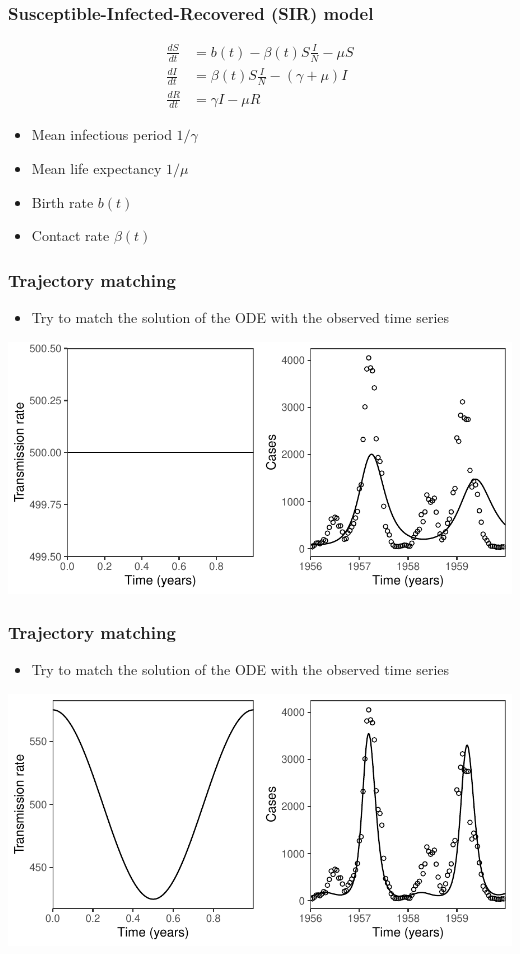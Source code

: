 \documentclass{beamer}
\begin{document}
\begin{frame}
\frametitle{Susceptible-Infected-Recovered (SIR) model}
$$
\begin{aligned}
\frac{dS}{dt} &= b(t) - \beta(t) S \frac{I}{N} - \mu S\\
\frac{dI}{dt} &= \beta(t) S \frac{I}{N} - (\gamma + \mu) I\\
\frac{dR}{dt} &= \gamma I - \mu R
\end{aligned}
$$
\begin{itemize}
	\item Mean infectious period $1/\gamma$
	\item Mean life expectancy $1/\mu$
	\item Birth rate $b(t)$
	\item Contact rate $\beta(t)$
\end{itemize}
\end{frame}

\begin{frame}
\frametitle{Trajectory matching}
\begin{itemize}
	\item Try to match the solution of the ODE with the observed time series
\end{itemize}
\begin{center}
\includegraphics[width=\textwidth]{traj1.pdf}
\end{center}
\end{frame}

\begin{frame}
\frametitle{Trajectory matching}
\begin{itemize}
	\item Try to match the solution of the ODE with the observed time series
\end{itemize}
\begin{center}
\includegraphics[width=\textwidth]{traj2.pdf}
\end{center}
\end{frame}
\end{document}

